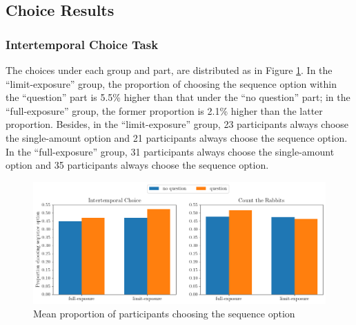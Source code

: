 \documentclass[
  12pt,
]{article}
\begin{document}
\hypertarget{choice-results}{%
\subsection{Choice Results}\label{choice-results}}

\hypertarget{intertemporal-choice-task}{%
\subsubsection{Intertemporal Choice
Task}\label{intertemporal-choice-task}}

The choices under each group and part, are distributed as in Figure
\ref{fig:exp3_mean_choice}. In the ``limit-exposure'' group, the
proportion of choosing the sequence option within the ``question'' part
is 5.5\% higher than that under the ``no question'' part; in the
``full-exposure'' group, the former proportion is 2.1\% higher than the
latter proportion. Besides, in the ``limit-exposure'' group, 23
participants always choose the single-amount option and 21 participants
always choose the sequence option. In the ``full-exposure'' group, 31
participants always choose the single-amount option and 35 participants
always choose the sequence option.

\begin{figure}
  \centering
  \includegraphics[width=\linewidth]{figures/seq_choice_ratio.png}
  \caption{Mean proportion of participants choosing the sequence option}
  \label{fig:exp3_mean_choice}
\end{figure}
\end{document}
